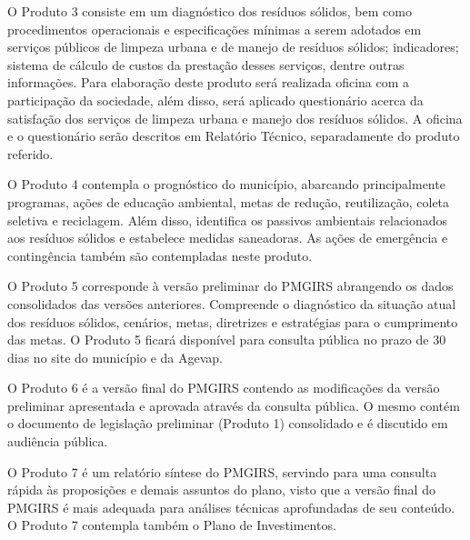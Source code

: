 O Produto 3 consiste em um diagnóstico dos resíduos sólidos, bem como procedimentos operacionais e especificações mínimas a serem adotados em serviços públicos de limpeza urbana e de manejo de resíduos sólidos; indicadores; sistema de cálculo de custos da prestação desses serviços, dentre outras informações. Para elaboração deste produto será realizada oficina com a participação da sociedade, além disso, será aplicado questionário acerca da satisfação dos serviços de limpeza urbana e manejo dos resíduos sólidos. A oficina e o questionário serão descritos em Relatório Técnico, separadamente do produto referido.\vspace{1.5em}

O Produto 4 contempla o prognóstico do município, abarcando principalmente programas, ações de educação ambiental, metas de redução, reutilização, coleta seletiva e reciclagem. Além disso, identifica os passivos ambientais relacionados aos resíduos sólidos e estabelece medidas saneadoras. As ações de emergência e contingência também são contempladas neste produto.\vspace{1.5em}

O Produto 5 corresponde à versão preliminar do PMGIRS abrangendo os dados consolidados das versões anteriores. Compreende o diagnóstico da situação atual dos resíduos sólidos, cenários, metas, diretrizes e estratégias para o cumprimento das metas. O Produto 5 ficará disponível para consulta pública no prazo de 30 dias no site do município e da Agevap.\vspace{1.5em}

O Produto 6 é a versão final do PMGIRS contendo as modificações da versão preliminar apresentada e aprovada através da consulta pública. O mesmo contém o documento de legislação preliminar (Produto 1) consolidado e é discutido em audiência pública.\vspace{1.5em}

O Produto 7 é um relatório síntese do PMGIRS, servindo para uma consulta rápida às proposições e demais assuntos do plano, visto que a versão final do PMGIRS é mais adequada para análises técnicas aprofundadas de seu conteúdo. O Produto 7 contempla também o Plano de Investimentos.
